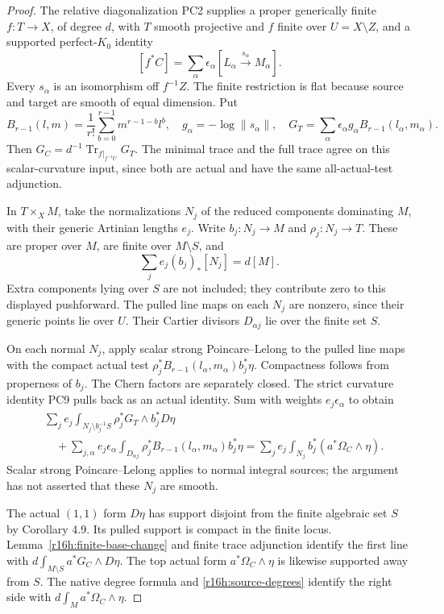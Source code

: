 \begin{proof}
The relative diagonalization PC2 supplies a proper generically finite
$f:T\to X$, of degree $d$, with $T$ smooth projective and $f$ finite
over $U=X\setminus Z$, and a supported perfect-$K_0$ identity
\[
 [f^*C]=\sum_\alpha\epsilon_\alpha[L_\alpha\xrightarrow{s_\alpha}M_\alpha].
\]
Every $s_\alpha$ is an isomorphism off $f^{-1}Z$. The finite restriction
is flat because source and target are smooth of equal dimension. Put
\[
 B_{r-1}(l,m)=\frac1{r!}\sum_{b=0}^{r-1}m^{r-1-b}l^b,
 \quad g_\alpha=-\log\|s_\alpha\|,\quad
 G_T=\sum_\alpha\epsilon_\alpha g_\alpha B_{r-1}(l_\alpha,m_\alpha).
\]
Then $G_C=d^{-1}\operatorname{Tr}_{f|_{f^{-1}U}}G_T$. The minimal
trace and the full trace agree on this scalar-curvature input, since
both are actual and have the same all-actual-test adjunction.

In $T\times_X M$, take the normalizations $N_j$ of the reduced
components dominating $M$, with their generic Artinian lengths $e_j$.
Write $b_j:N_j\to M$ and $\rho_j:N_j\to T$. These are proper over
$M$, are finite over $M\setminus S$, and
\[
                  \sum_j e_j(b_j)_*[N_j]=d[M].
 \tag{H16.5}\label{r16h:source-degrees}
\]
Extra components lying over $S$ are not included; they contribute zero
to this displayed pushforward. The pulled line maps on each $N_j$ are
nonzero, since their generic points lie over $U$. Their Cartier
divisors $D_{\alpha j}$ lie over the finite set $S$.

On each normal $N_j$, apply scalar strong Poincare--Lelong to the
pulled line maps with the compact actual test
$\rho_j^*B_{r-1}(l_\alpha,m_\alpha)b_j^*\eta$. Compactness follows
from properness of $b_j$. The Chern factors are separately closed.
The strict curvature identity PC9 pulls back as an actual identity.
Sum with weights $e_j\epsilon_\alpha$ to obtain
\begin{align*}
 &\sum_j e_j\int_{N_j\setminus b_j^{-1}S}
                    \rho_j^*G_T\wedge b_j^*D\eta\\
 &\quad+\sum_{j,\alpha}e_j\epsilon_\alpha
       \int_{D_{\alpha j}}\rho_j^*B_{r-1}(l_\alpha,m_\alpha)b_j^*\eta
       =\sum_j e_j\int_{N_j}b_j^*(a^*\Omega_C\wedge\eta).
 \tag{H16.6}\label{r16h:upstairs-slice}
\end{align*}
Scalar strong Poincare--Lelong applies to normal integral sources; the
argument has not asserted that these $N_j$ are smooth.

The actual $(1,1)$ form $D\eta$ has support disjoint from the finite
algebraic set $S$ by Corollary 4.9. Its pulled support is compact in
the finite locus. Lemma~\ref{r16h:finite-base-change} and finite trace
adjunction identify the first line with
$d\int_{M\setminus S}a^*G_C\wedge D\eta$.
The top actual form $a^*\Omega_C\wedge\eta$ is likewise supported
away from $S$. The native degree formula and
\eqref{r16h:source-degrees} identify the right side with
$d\int_Ma^*\Omega_C\wedge\eta$.


\end{proof}
